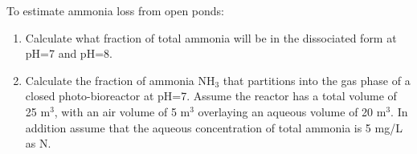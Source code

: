 \documentclass[12pt,letterpaper]{article}
\begin{document}
To estimate ammonia loss from open ponds:\\

\begin{enumerate}

\item  Calculate what fraction of total ammonia will be in the dissociated form at pH=7 and pH=8.

\item  Calculate the fraction of ammonia NH$_3$ that partitions into the gas phase of a closed photo-bioreactor at pH=7.  Assume the reactor has a total volume of 25 m$^3$, with an air volume of 5 m$^3$ overlaying an aqueous volume of 20 m$^3$.  In addition assume that the aqueous concentration of total ammonia is 5 mg/L as N.




\end{enumerate}
\end{document}
